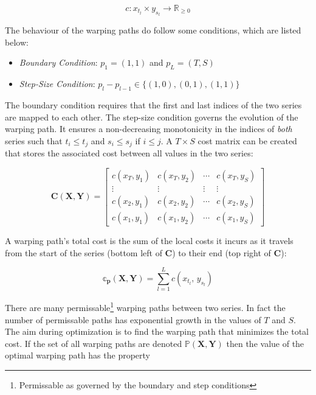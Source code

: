 \documentclass[12pt]{article}
\begin{document}
\begin{equation}
    c: x_{t_{l}} \times y_{s_{l}} \rightarrow \mathbb{R}_{\ge 0}
\end{equation}

The behaviour of the warping paths do follow some conditions, which are listed below:

\begin{itemize}
    \item \emph{Boundary Condition}: $p_{1} = (1, 1)$ and $p_{L} = (T, S)$ 
    \item \emph{Step-Size Condition}: $p_{l} - p_{l - 1} \in \{ (1, 0), (0, 1), (1, 1) \} $
\end{itemize}

The boundary condition requires that the first and last indices of the two series are mapped to each other. The step-size condition governs the evolution of the warping path. It ensures a non-decreasing monotonicity in the indices of \emph{both} series such that $t_{i} \le t_{j}$ and $s_{i} \le s_{j}$ if $i \le j$. A $T \times S$ cost matrix can be created that stores the associated cost between all values in the two series:

\begin{equation}
    \mathbf{C}(\boldsymbol{X}, \boldsymbol{Y}) = \left[ 
        \begin{array}{cccc}
            c(x_{T}, y_{1}) & c(x_{T}, y_{2}) & \cdots & c(x_{T}, y_{S}) \\ 
            \vdots          & \vdots          & \vdots & \vdots          \\
            c(x_{2}, y_{1}) & c(x_{2}, y_{2}) & \cdots & c(x_{2}, y_{S}) \\ 
            c(x_{1}, y_{1}) & c(x_{1}, y_{2}) & \cdots & c(x_{1}, y_{S})
    \end{array}\right]
\end{equation}

A warping path's total cost is the sum of the local costs it incurs as it travels from the start of the series (bottom left of $\boldsymbol{C}$) to their end (top right of $\boldsymbol{C}$):

\begin{equation}
    \mathbb{c}_{\boldsymbol{p}}(\boldsymbol{X}, \boldsymbol{Y}) = \sum^{L}_{l=1} c(x_{t_{l}},\, y_{s_{l}})
\end{equation}

There are many permissable\footnote{Permissable as governed by the boundary and step conditions} warping paths between two series. In fact the number of permissable paths has exponential growth in the values of $T$ and $S$. The aim during optimization is to find the warping path that minimizes the total cost. If the set of all warping paths are denoted $\mathbb{P}(\boldsymbol{X}, \boldsymbol{Y})$ then the value of the optimal warping path has the property
\end{document}
